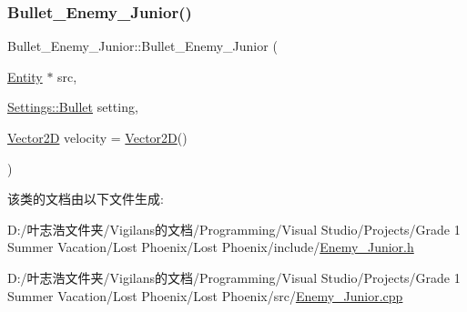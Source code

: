\subsubsection{\texorpdfstring{Bullet\+\_\+\+Enemy\+\_\+\+Junior()}{Bullet\_Enemy\_Junior()}}
{\footnotesize\ttfamily Bullet\+\_\+\+Enemy\+\_\+\+Junior\+::\+Bullet\+\_\+\+Enemy\+\_\+\+Junior (\begin{DoxyParamCaption}\item[{\hyperlink{class_entity}{Entity} $\ast$}]{src,  }\item[{\hyperlink{struct_settings_1_1_bullet}{Settings\+::\+Bullet}}]{setting,  }\item[{\hyperlink{_vector2_d_8hpp_aa1f1145650f1dd9bddf7335ec6434d7c}{Vector2D}}]{velocity = {\ttfamily \hyperlink{_vector2_d_8hpp_aa1f1145650f1dd9bddf7335ec6434d7c}{Vector2D}()} }\end{DoxyParamCaption})}



该类的文档由以下文件生成\+:\begin{DoxyCompactItemize}
\item 
D\+:/叶志浩文件夹/\+Vigilans的文档/\+Programming/\+Visual Studio/\+Projects/\+Grade 1 Summer Vacation/\+Lost Phoenix/\+Lost Phoenix/include/\hyperlink{_enemy___junior_8h}{Enemy\+\_\+\+Junior.\+h}\item 
D\+:/叶志浩文件夹/\+Vigilans的文档/\+Programming/\+Visual Studio/\+Projects/\+Grade 1 Summer Vacation/\+Lost Phoenix/\+Lost Phoenix/src/\hyperlink{_enemy___junior_8cpp}{Enemy\+\_\+\+Junior.\+cpp}\end{DoxyCompactItemize}
